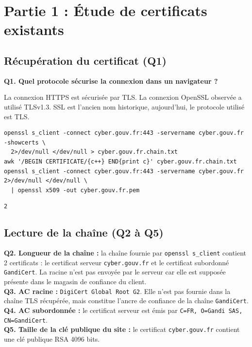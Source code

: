 \documentclass[11pt,a4paper]{article}
\begin{document}
\newpage

\section{Partie 1 : Étude de certificats existants}

\subsection{Récupération du certificat (Q1)}

\textbf{Q1. Quel protocole sécurise la connexion dans un navigateur ?}
\begin{reponse}
La connexion HTTPS est sécurisée par TLS. La connexion OpenSSL observée a utilisé TLSv1.3. SSL est l'ancien nom historique, aujourd'hui, le protocole utilisé est TLS.
\end{reponse}

\begin{lstlisting}[style=cmd]
openssl s_client -connect cyber.gouv.fr:443 -servername cyber.gouv.fr -showcerts \
  2>/dev/null </dev/null > cyber.gouv.fr.chain.txt
awk '/BEGIN CERTIFICATE/{c++} END{print c}' cyber.gouv.fr.chain.txt
openssl s_client -connect cyber.gouv.fr:443 -servername cyber.gouv.fr 2>/dev/null </dev/null \
  | openssl x509 -out cyber.gouv.fr.pem
\end{lstlisting}
\begin{lstlisting}[style=out]
2
\end{lstlisting}

\subsection{Lecture de la chaîne (Q2 à Q5)}
\begin{reponse}
\textbf{Q2. Longueur de la chaîne :} la chaîne fournie par \texttt{openssl s\_client}
contient 2 certificats : le certificat serveur \texttt{cyber.gouv.fr} et le
certificat subordonné \texttt{GandiCert}. La racine n'est pas envoyée par le serveur car
elle est supposée présente dans le magasin de confiance du client.\\[4pt]
\textbf{Q3. AC racine :} \texttt{DigiCert Global Root G2}. Elle n'est pas fournie dans
la chaîne TLS récupérée, mais constitue l'ancre de confiance de la chaîne
\texttt{GandiCert}.\\[4pt]
\textbf{Q4. AC subordonnée :} le certificat serveur est émis par
\texttt{C=FR, O=Gandi SAS, CN=GandiCert}.\\[4pt]
\textbf{Q5. Taille de la clé publique du site :} le certificat \texttt{cyber.gouv.fr}
contient une clé publique RSA 4096 bits.
\end{reponse}
\end{document}
